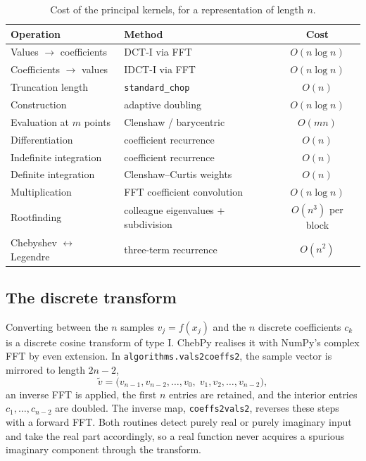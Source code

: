 \documentclass[11pt,a4paper]{article}
\newcommand{\code}[1]{\texttt{#1}}
\begin{document}
\begin{table}[htbp]
\centering
\begin{tabular}{@{}llc@{}}
\toprule
\textbf{Operation} & \textbf{Method} & \textbf{Cost} \\
\midrule
Values $\to$ coefficients & DCT-I via FFT           & $O(n \log n)$ \\
Coefficients $\to$ values & IDCT-I via FFT          & $O(n \log n)$ \\
Truncation length         & \code{standard\_chop}   & $O(n)$ \\
Construction              & adaptive doubling       & $O(n \log n)$ \\
Evaluation at $m$ points  & Clenshaw / barycentric  & $O(mn)$ \\
Differentiation           & coefficient recurrence  & $O(n)$ \\
Indefinite integration    & coefficient recurrence  & $O(n)$ \\
Definite integration      & Clenshaw--Curtis weights& $O(n)$ \\
Multiplication            & FFT coefficient convolution & $O(n \log n)$ \\
Rootfinding               & colleague eigenvalues + subdivision & $O(n^3)$ per block \\
Chebyshev $\leftrightarrow$ Legendre & three-term recurrence & $O(n^2)$ \\
\bottomrule
\end{tabular}
\caption{Cost of the principal kernels, for a representation of length $n$.}
\label{tab:complexity}
\end{table}

\subsection{The discrete transform}

Converting between the $n$ samples $v_j = f(x_j)$ and the $n$ discrete
coefficients $c_k$ is a discrete cosine transform of type I. ChebPy realises it
with NumPy's complex FFT by even extension. In
\code{algorithms.vals2coeffs2}, the sample vector is mirrored to length
$2n - 2$,
\[
  \tilde v = \bigl(v_{n-1}, v_{n-2}, \ldots, v_0,\;
                   v_1, v_2, \ldots, v_{n-2}\bigr),
\]
an inverse FFT is applied, the first $n$ entries are retained, and the interior
entries $c_1, \ldots, c_{n-2}$ are doubled. The inverse map,
\code{coeffs2vals2}, reverses these steps with a forward FFT. Both routines
detect purely real or purely imaginary input and take the real part
accordingly, so a real function never acquires a spurious imaginary component
through the transform.
\end{document}
